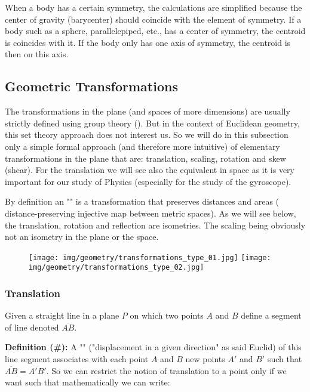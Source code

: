	\begin{tcolorbox}[title=Remark,colframe=black,arc=10pt]
	When a body has a certain symmetry, the calculations are simplified because the center of gravity (barycenter) should coincide with the element of symmetry. If a body such as a sphere, parallelepiped, etc., has a center of symmetry, the centroid is coincides with it. If the body only has one axis of symmetry, the centroid is then on this axis.
	\end{tcolorbox}
	
	\subsection{Geometric Transformations}\label{geometric transformations}
	The transformations in the plane (and spaces of more dimensions) are usually strictly defined using group theory (). But in the context of Euclidean geometry, this set theory approach does not interest us. So we will do in this subsection only a simple formal approach (and therefore more intuitive) of elementary transformations in the plane that are: translation, scaling, rotation and skew (shear). For the translation we will see also the equivalent in space as it is very important for our study of Physics (especially for the study of the gyroscope).
	\begin{tcolorbox}[title=Remark,colframe=black,arc=10pt]
	By definition an "" is a transformation that preserves distances and areas ( distance-preserving injective map between metric spaces). As we will see below, the translation, rotation and reflection are isometries. The scaling being obviously not an isometry in the plane or the space.
	\end{tcolorbox}
	\begin{figure}[H]
		\centering
		\texttt{[image: img/geometry/transformations\_type\_01.jpg]}
		\texttt{[image: img/geometry/transformations\_type\_02.jpg]}
	\end{figure}
	
	\pagebreak
	\subsubsection{Translation}
	Given a straight line in a plane $P$ on which two points $A$ and $B$ define a segment of line denoted $\overline{AB}$.

	\textbf{Definition (\#\mydef):} A "" ("displacement in a given direction" as said Euclid) of this line segment associates with each point $A$ and $B$ new points $A'$ and $B'$ such that $\overline{AB}=\overline{A'B'}$. So we can restrict the notion of translation to a point only if we want such that mathematically we can write:
	
